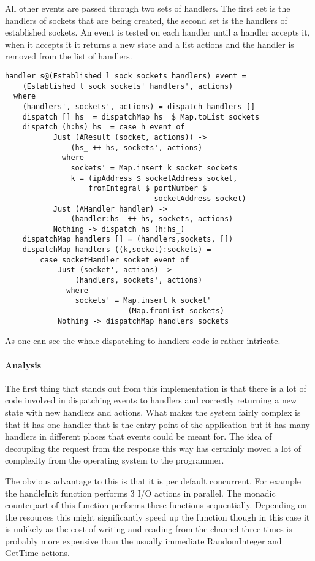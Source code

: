 All other events are passed through two sets of handlers. The first set is the handlers of sockets that are being created, the second set is the handlers of established sockets. An event is tested on each handler until a handler accepts it, when it accepts it it returns a new state and a list actions and the handler is removed from the list of handlers.

\begin{lstlisting}[caption={Dispatching to handlers}]
handler s@(Established l sock sockets handlers) event =
    (Established l sock sockets' handlers', actions)
  where
    (handlers', sockets', actions) = dispatch handlers []
    dispatch [] hs_ = dispatchMap hs_ $ Map.toList sockets
    dispatch (h:hs) hs_ = case h event of
           Just (AResult (socket, actions)) ->
               (hs_ ++ hs, sockets', actions)
             where
               sockets' = Map.insert k socket sockets
               k = (ipAddress $ socketAddress socket,
                   fromIntegral $ portNumber $
                                  socketAddress socket)
           Just (AHandler handler) ->
               (handler:hs_ ++ hs, sockets, actions)
           Nothing -> dispatch hs (h:hs_)
    dispatchMap handlers [] = (handlers,sockets, [])
    dispatchMap handlers ((k,socket):sockets) =
        case socketHandler socket event of
            Just (socket', actions) -> 
                (handlers, sockets', actions)
              where
                sockets' = Map.insert k socket'
                            (Map.fromList sockets)
            Nothing -> dispatchMap handlers sockets
\end{lstlisting}

As one can see the whole dispatching to handlers code is rather intricate. 

\paragraph{Analysis}
The first thing that stands out from this implementation is that there is a lot of code involved in dispatching events to handlers and correctly returning a new state with new handlers and actions. What makes the system fairly complex is that it has one handler that is the entry point of the application but it has many handlers in different places that events could be meant for. The idea of decoupling the request from the response this way has certainly moved a lot of complexity from the operating system to the programmer.

The obvious advantage to this is that it is per default concurrent. For example the handleInit function performs 3 I/O actions in parallel. The monadic counterpart of this function performs these functions sequentially. Depending on the resources this might significantly speed up the function though in this case it is unlikely as the cost of writing and reading from the channel three times is probably more expensive than the usually immediate RandomInteger and GetTime actions. 

